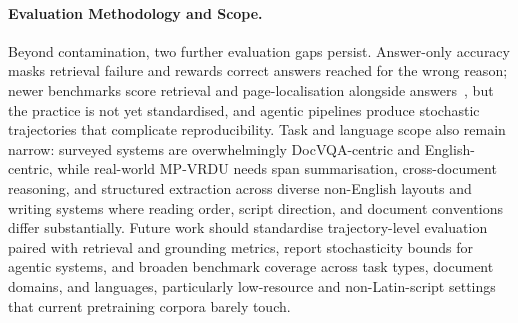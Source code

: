 \documentclass[11pt]{article}
\begin{document}
\paragraph{Evaluation Methodology and Scope.}
\label{sec:chal-eval}
Beyond contamination, two further evaluation gaps persist. Answer-only accuracy masks retrieval failure and rewards correct answers reached for the wrong reason; newer benchmarks score retrieval and page-localisation alongside answers~\cite{hui2024uda, xiong2026docr1, zhu2025doclens}, but the practice is not yet standardised, and agentic pipelines produce stochastic trajectories that complicate reproducibility. Task and language scope also remain narrow: surveyed systems are overwhelmingly DocVQA-centric and English-centric, while real-world MP-VRDU needs span summarisation, cross-document reasoning, and structured extraction across diverse non-English layouts and writing systems where reading order, script direction, and document conventions differ substantially. Future work should standardise trajectory-level evaluation paired with retrieval and grounding metrics, report stochasticity bounds for agentic systems, and broaden benchmark coverage across task types, document domains, and languages, particularly low-resource and non-Latin-script settings that current pretraining corpora barely touch.

\end{document}
